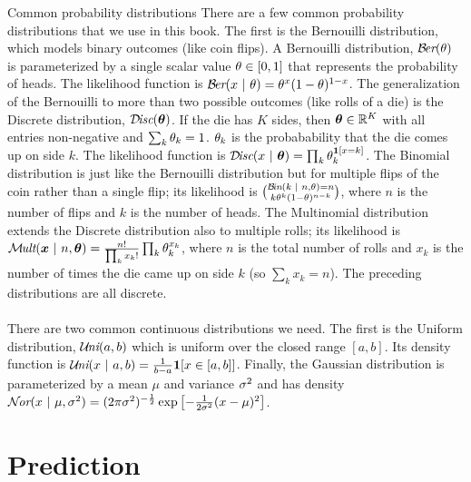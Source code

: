 \begin{mathreview}{Common probability distributions}
  There are a few common probability distributions that we use in this book.
  The first is the Bernouilli distribution, which models binary outcomes (like coin flips).
  A Bernouilli distribution, $\mathcal{B}\hspace{-0.5mm}\textit{er}(\theta)$ is parameterized by a single scalar value $\theta \in [0,1]$ that represents the probability of heads. The likelihood function is $\mathcal{B}\hspace{-0.5mm}\textit{er}(x \textrm{~}\arrowvert\textrm{~} \theta) = \theta^x (1-\theta)^{1-x}$.
  The generalization of the Bernouilli to more than two possible outcomes (like rolls of a die) is the Discrete distribution, $\mathcal{D}\hspace{-0.5mm}\textit{isc}(\boldsymbol{\theta})$. If the die has $K$ sides, then $\boldsymbol{\theta} \in \mathbb{R}^K$ with all entries non-negative and $\sum_k \theta_k = 1$. $\theta_k$ is the probabability that the die comes up on side $k$. The likelihood function is $\mathcal{D}\hspace{-0.5mm}\textit{isc}(x \textrm{~}\arrowvert\textrm{~} \boldsymbol{\theta}) = \prod_k \theta_k^{\boldsymbol{1}[x=k]}$.
  The Binomial distribution is just like the Bernouilli distribution but for multiple flips of the coin rather than a single flip; its likelihood is $\mathcal{B}\hspace{-0.5mm}\textit{in}(k \textrm{~}\arrowvert\textrm{~} n, \theta) = n \choose k \theta^k (1-\theta)^{n-k}$, where $n$ is the number of flips and $k$ is the number of heads.
  The Multinomial distribution extends the Discrete distribution also to multiple rolls; its likelihood is $\mathcal{M}\hspace{-0.5mm}\textit{ult}(\boldsymbol{x} \textrm{~}\arrowvert\textrm{~} n, \boldsymbol{\theta}) = \frac {n!} {\prod_k x_k!} \prod_k \theta_k^{x_k}$, where $n$ is the total number of rolls and $x_k$ is the number of times the die came up on side $k$ (so $\sum_k x_k = n$).
  The preceding distributions are all discrete.
  ~\\~\\
  There are two common continuous distributions we need. The first is the Uniform distribution, $\mathcal{U}\hspace{-0.5mm}\textit{ni}(a,b)$ which is uniform over the closed range $[a,b]$. Its density function is $\mathcal{U}\hspace{-0.5mm}\textit{ni}(x \textrm{~}\arrowvert\textrm{~} a,b) = \frac 1 {b-a} \boldsymbol{1}[x \in [a,b]]$.
  Finally, the Gaussian distribution is parameterized by a mean $\mu$ and variance $\sigma^2$ and has density $\mathcal{N}\hspace{-0.5mm}\textit{or}(x \textrm{~}\arrowvert\textrm{~} \mu,\sigma^2) = (2 \pi \sigma^2)^{-\frac 1 2} \exp\left[ - \frac 1 {2 \sigma^2} (x-\mu)^2\right]$.
\end{mathreview}


\section{Prediction}

